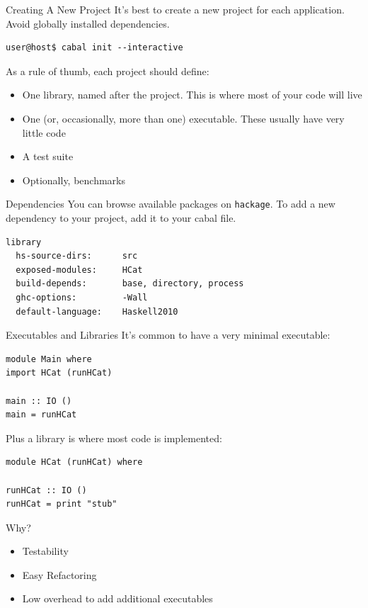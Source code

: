 \documentclass[10pt, presentation, colorlinks]{beamer}
\begin{document}
\begin{frame}[label={sec:org2fe39fe},fragile]{Creating A New Project}
 It's best to create a new project for each application. Avoid globally installed dependencies.
\pause
\bigskip
\begin{verbatim}
user@host$ cabal init --interactive
\end{verbatim}
\pause
As a rule of thumb, each project should define:
\bigskip
\begin{itemize}
\item One library, named after the project. This is where most of your code will live
\item One (or, occasionally, more than one) executable. These usually have very little code
\item A test suite
\item Optionally, benchmarks
\end{itemize}
\end{frame}

\begin{frame}[label={sec:org7c0a8fe},fragile]{Dependencies}
 You can browse available packages on \alert{\texttt{hackage}}. To add a new dependency to your project, add it to your cabal file.

\bigskip

\begin{verbatim}
library
  hs-source-dirs:      src
  exposed-modules:     HCat
  build-depends:       base, directory, process
  ghc-options:         -Wall
  default-language:    Haskell2010
\end{verbatim}
\end{frame}

\begin{frame}[label={sec:org0926380},fragile]{Executables and Libraries}
 It's common to have a very minimal executable:

\begin{verbatim}
module Main where
import HCat (runHCat)

main :: IO ()
main = runHCat
\end{verbatim}

\pause
\bigskip

Plus a library is where most code is implemented:

\begin{verbatim}
module HCat (runHCat) where

runHCat :: IO ()
runHCat = print "stub"
\end{verbatim}

\pause
\bigskip

Why?
\pause
\begin{itemize}
\item Testability
\item Easy Refactoring
\item Low overhead to add additional executables
\end{itemize}
\end{frame}
\end{document}
